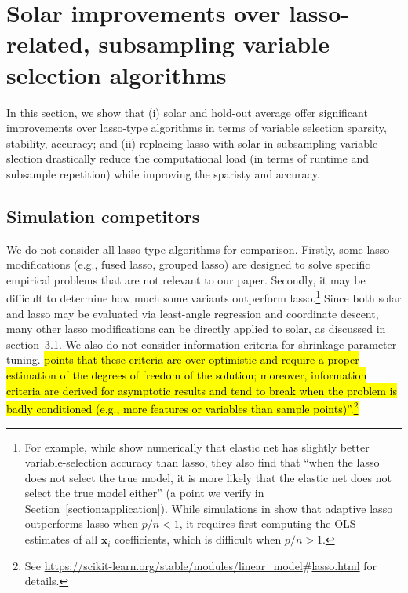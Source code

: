 \documentclass[12pt]{article}
\begin{document}

\section{Solar improvements over lasso-related, subsampling variable selection algorithms\label{section:comp}}

In this section, we show that (i) solar and hold-out average offer significant improvements over lasso-type algorithms in terms of variable selection sparsity, stability, accuracy; and (ii) replacing lasso with solar in subsampling variable slection drastically reduce the computational load (in terms of runtime and subsample repetition) while improving the sparisty and accuracy.

\subsection{Simulation competitors}

We do not consider all lasso-type algorithms for comparison. Firstly, some lasso modifications (e.g., fused lasso, grouped lasso) are designed to solve specific empirical problems that are not relevant to our paper. Secondly, it may be difficult to determine how much some variants outperform lasso.\footnote{For example, while \citet{jia2010model} show numerically that elastic net has slightly better variable-selection accuracy than lasso, they also find that ``when the lasso does not select the true model, it is more likely that the elastic net does not select the true model either'' (a point we verify in Section~\ref{section:application}). While simulations in \citet{zou2006adaptive} show that adaptive lasso outperforms lasso when $p/n<1$, it requires first computing the OLS estimates of all $\mathbf{x}_i$ coefficients, which is difficult when $p/n>1$.} Since both solar and lasso may be evaluated via least-angle regression and coordinate descent, many other lasso modifications can be directly applied to solar, as discussed in section~3.1. We also do not consider information criteria for shrinkage parameter tuning. \citet{scikit-learn} \hl{points that these criteria are over-optimistic and require a proper estimation of the degrees of freedom of the solution; moreover, information criteria are derived for asymptotic results and tend to break when the problem is badly conditioned (e.g., more features or variables than sample points)''.\footnote{See \url{https://scikit-learn.org/stable/modules/linear_model}$\#$\url{lasso.html} for details.}}
\end{document}
